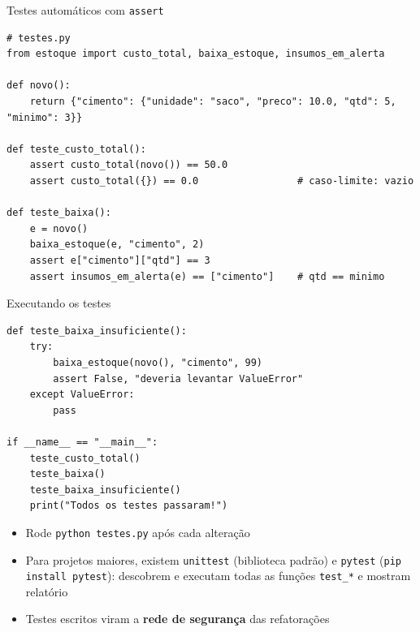\documentclass[aspectratio=169,10pt,t]{beamer}
\begin{document}
\begin{frame}[fragile]{Testes automáticos com \texttt{assert}}
\begin{lstlisting}[basicstyle=\ttfamily\scriptsize]
# testes.py
from estoque import custo_total, baixa_estoque, insumos_em_alerta

def novo():
    return {"cimento": {"unidade": "saco", "preco": 10.0, "qtd": 5, "minimo": 3}}

def teste_custo_total():
    assert custo_total(novo()) == 50.0
    assert custo_total({}) == 0.0                 # caso-limite: vazio

def teste_baixa():
    e = novo()
    baixa_estoque(e, "cimento", 2)
    assert e["cimento"]["qtd"] == 3
    assert insumos_em_alerta(e) == ["cimento"]    # qtd == minimo
\end{lstlisting}
\end{frame}

\begin{frame}[fragile]{Executando os testes}
\begin{lstlisting}[basicstyle=\ttfamily\scriptsize]
def teste_baixa_insuficiente():
    try:
        baixa_estoque(novo(), "cimento", 99)
        assert False, "deveria levantar ValueError"
    except ValueError:
        pass

if __name__ == "__main__":
    teste_custo_total()
    teste_baixa()
    teste_baixa_insuficiente()
    print("Todos os testes passaram!")
\end{lstlisting}
  \begin{itemize}\small
    \item Rode \texttt{python testes.py} após \alert{cada} alteração
    \item Para projetos maiores, existem \texttt{unittest} (biblioteca padrão) e \texttt{pytest} (\texttt{pip install pytest}): descobrem e executam todas as funções \texttt{test\_*} e mostram relatório
    \item Testes escritos viram a \textbf{rede de segurança} das refatorações
  \end{itemize}
\end{frame}
\end{document}
